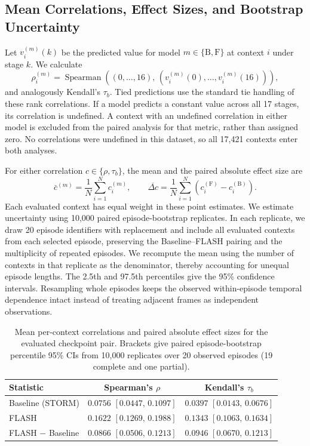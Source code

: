 \documentclass{article} %
\begin{document}
\subsection{Mean Correlations, Effect Sizes, and Bootstrap Uncertainty}
Let $v_i^{(m)}(k)$ be the predicted value for model $m\in\{\mathrm{B},\mathrm{F}\}$ at context $i$ under stage $k$. We calculate
\begin{equation}
\rho_i^{(m)}=\operatorname{Spearman}\!\left((0,\ldots,16),\,(v_i^{(m)}(0),\ldots,v_i^{(m)}(16))\right),
\label{eq:value_context_rho}
\end{equation}
and analogously Kendall's $\tau_b$. Tied predictions use the standard tie handling of these rank correlations. If a model predicts a constant value across all 17 stages, its correlation is undefined. A context with an undefined correlation in either model is excluded from the paired analysis for that metric, rather than assigned zero. No correlations were undefined in this dataset, so all 17,421 contexts enter both analyses.

For either correlation $c\in\{\rho,\tau_b\}$, the mean and the paired absolute effect size are
\begin{equation}
\bar c^{(m)}=\frac{1}{N}\sum_{i=1}^{N}c_i^{(m)},\qquad
\overline{\Delta c}=\frac{1}{N}\sum_{i=1}^{N}\left(c_i^{(\mathrm{F})}-c_i^{(\mathrm{B})}\right).
\label{eq:value_mean_effect}
\end{equation}
Each evaluated context has equal weight in these point estimates. We estimate uncertainty using 10,000 paired episode-bootstrap replicates. In each replicate, we draw 20 episode identifiers with replacement and include all evaluated contexts from each selected episode, preserving the Baseline--FLASH pairing and the multiplicity of repeated episodes. We recompute the mean using the number of contexts in that replicate as the denominator, thereby accounting for unequal episode lengths. The 2.5th and 97.5th percentiles give the 95\% confidence intervals. Resampling whole episodes keeps the observed within-episode temporal dependence intact instead of treating adjacent frames as independent observations.

\begin{table}[!t]
\centering
\small
\caption{Mean per-context correlations and paired absolute effect sizes for the evaluated checkpoint pair. Brackets give paired episode-bootstrap percentile 95\% CIs from 10,000 replicates over 20 observed episodes (19 complete and one partial).}
\label{tab:value_metrics}
\begin{tabular}{lcc}
\toprule
Statistic & Spearman's $\rho$ & Kendall's $\tau_b$ \\
\midrule
Baseline (STORM) & $0.0756$ $[0.0447,\,0.1097]$ & $0.0397$ $[0.0143,\,0.0676]$ \\
FLASH & $0.1622$ $[0.1269,\,0.1988]$ & $0.1343$ $[0.1063,\,0.1634]$ \\
FLASH $-$ Baseline & $0.0866$ $[0.0506,\,0.1213]$ & $0.0946$ $[0.0670,\,0.1213]$ \\
\bottomrule
\end{tabular}
\end{table}
\end{document}
